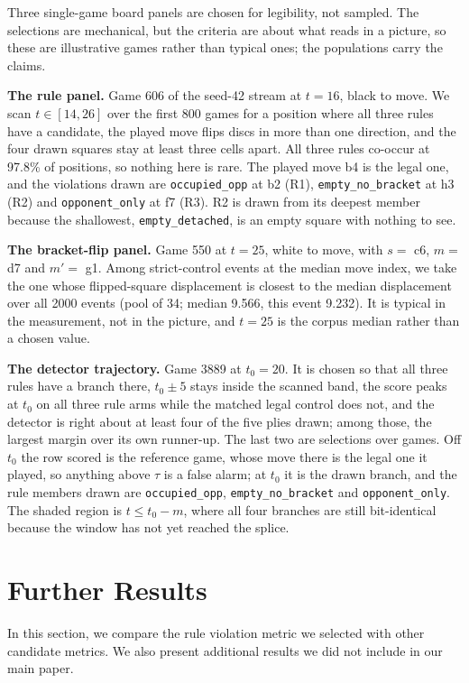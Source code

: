 \documentclass{article}
\begin{document}
Three single-game board panels are chosen for legibility, not sampled. The selections are
mechanical, but the criteria are about what reads in a picture, so these are illustrative games
rather than typical ones; the populations carry the claims.

\textbf{The rule panel.} Game 606 of the seed-42 stream at $t = 16$, black to move. We scan $t
\in [14, 26]$ over the first 800 games for a position where all three rules have a candidate, the
played move flips discs in more than one direction, and the four drawn squares stay at least
three cells apart. All three rules co-occur at 97.8\% of positions, so nothing here is rare. The
played move b4 is the legal one, and the violations drawn are \texttt{occupied\_opp} at b2 (R1),
\texttt{empty\_no\_bracket} at h3 (R2) and \texttt{opponent\_only} at f7 (R3). R2 is drawn from
its deepest member because the shallowest, \texttt{empty\_detached}, is an empty square with
nothing to see.

\textbf{The bracket-flip panel.} Game 550 at $t = 25$, white to move, with $s = $ c6, $m = $ d7
and $m' = $ g1. Among strict-control events at the median move index, we take the one whose
flipped-square displacement is closest to the median displacement over all 2000 events (pool of
34; median 9.566, this event 9.232). It is typical in the measurement, not in the picture, and
$t = 25$ is the corpus median rather than a chosen value.

\textbf{The detector trajectory.} Game 3889 at $t_0 = 20$. It is chosen so that all three rules
have a branch there, $t_0 \pm 5$ stays inside the scanned band, the score peaks at $t_0$ on all
three rule arms while the matched legal control does not, and the detector is right about at
least four of the five plies drawn; among those, the largest margin over its own runner-up. The
last two are selections over games. Off $t_0$ the row scored is the reference game, whose move
there is the legal one it played, so anything above $\tau$ is a false alarm; at $t_0$ it is the
drawn branch, and the rule members drawn are \texttt{occupied\_opp},
\texttt{empty\_no\_bracket} and \texttt{opponent\_only}. The shaded region is $t \le t_0 - m$,
where all four branches are still bit-identical because the window has not yet reached the
splice.

\section{Further Results}

In this section, we compare the rule violation metric we selected with other candidate metrics. We also present additional results 
we did not include in our main paper.  
\end{document}
